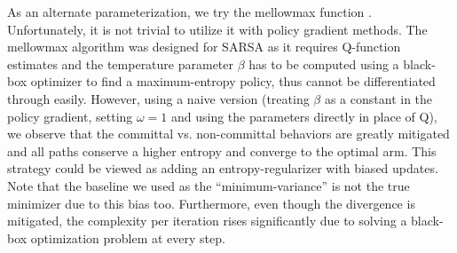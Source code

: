 As an alternate parameterization, we try the mellowmax function \cite{asadi2017alternative}.
Unfortunately, it is not trivial to utilize it with policy gradient methods.
The mellowmax algorithm was designed for SARSA as it requires Q-function estimates and the temperature parameter $\beta$ has to be computed using a black-box optimizer to find a maximum-entropy policy, thus cannot be differentiated through easily. However, using a naive version (treating $\beta$ as a constant in the policy gradient, setting $\omega = 1$ and using the parameters directly in place of Q), we observe that the committal vs. non-committal behaviors are greatly mitigated and all paths conserve a higher entropy and converge to the optimal arm. This strategy could be viewed as adding an entropy-regularizer with biased updates. Note that the baseline we used as the ``minimum-variance'' is not the true minimizer due to this bias too. Furthermore, even though the divergence is mitigated, the complexity per iteration rises significantly due to solving a black-box optimization problem at every step.



